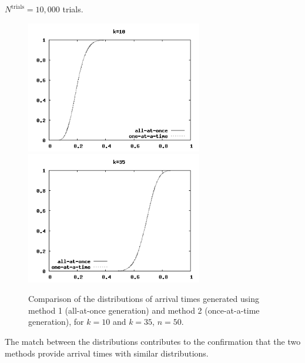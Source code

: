 \documentclass[12pt]{article} %
\begin{document}
$N^\text{trials}=10,000$ trials.
\begin{figure}[ht]
\centering
\includegraphics[width=7.7cm]{compOneAll10}
\includegraphics[width=7.7cm]{compOneAll35}
\vspace{-4mm}
\caption{Comparison of the distributions of arrival times generated using method 1 (all-at-once generation) and method 2 (once-at-a-time generation), for $k=10$ and $k=35$, $n=50$. }
\label{fig:compOneAll}
\vspace{-1mm}
\end{figure}
The match between the distributions contributes to the confirmation
that the two methods provide arrival times with similar distributions.
%
%
\end{document}
